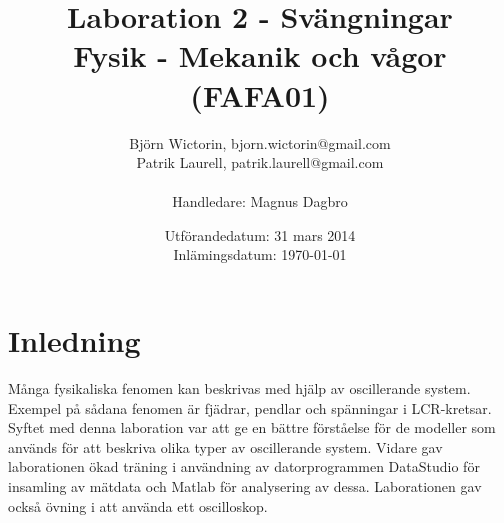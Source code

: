 \documentclass[a4paper,10pt]{article}
\title{Laboration 2 - Svängningar \\ Fysik - Mekanik och vågor (FAFA01)}
\author{Björn Wictorin, bjorn.wictorin@gmail.com \\ Patrik Laurell, patrik.laurell@gmail.com \\ \\ Handledare: Magnus Dagbro}
\date{Utförandedatum: 31 mars 2014 \\ Inlämingsdatum: \today}
\begin{document}
\maketitle
\thispagestyle{empty}
\newpage
{}
\tableofcontents{}
\pagebreak


\section{Inledning}
Många fysikaliska fenomen kan beskrivas med hjälp av oscillerande system. Exempel på sådana fenomen är fjädrar, pendlar och spänningar i LCR-kretsar. Syftet med denna laboration var att ge en bättre förståelse för de modeller som används för att beskriva olika typer av oscillerande system. Vidare gav laborationen ökad träning i användning av datorprogrammen DataStudio för insamling av mätdata och Matlab för analysering av dessa. Laborationen gav också övning i att använda ett oscilloskop.
\end{document}
